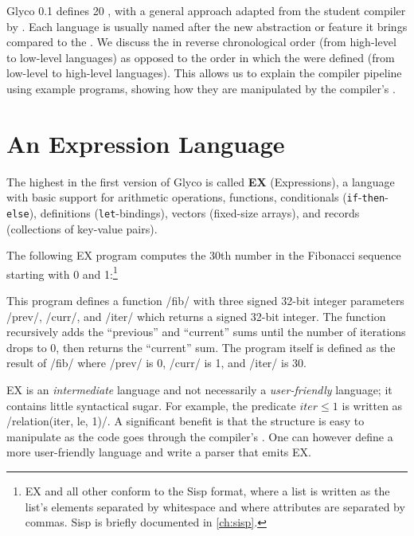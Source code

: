 \documentclass[main.tex]{subfiles}
\begin{document}
Glyco 0.1 defines 20 , with a general approach adapted from the student compiler by \citet{compcourse}. Each language is usually named after the new abstraction or feature it brings compared to the . We discuss the  in reverse chronological order (from high-level to low-level languages) as opposed to the order in which the  were defined (from low-level to high-level languages). This allows us to explain the compiler pipeline using example programs, showing how they are manipulated by the compiler's .

\section{An Expression Language} \label{sct:ex}
The highest  in the first version of Glyco is called \textbf{EX} (Expressions), a language with basic support for arithmetic operations, functions, conditionals (\texttt{if}-\texttt{then}-\texttt{else}), definitions (\texttt{let}-bindings), vectors (fixed-size arrays), and records (collections of key-value pairs).

The following EX program computes the 30th number in the Fibonacci sequence starting with 0 and 1:\footnote{EX and all other  conform to the Sisp format, where a list is written as the list's elements separated by whitespace and where attributes are separated by commas. Sisp is briefly documented in \cref{ch:sisp}.}

This program defines a function \iil/fib/ with three signed 32-bit integer parameters \iil/prev/, \iil/curr/, and \iil/iter/ which returns a signed 32-bit integer. The function recursively adds the \enquote{previous} and \enquote{current} sums until the number of iterations drops to 0, then returns the \enquote{current} sum. The program itself is defined as the result of \iil/fib/ where \iil/prev/ is 0, \iil/curr/ is 1, and \iil/iter/ is 30.

EX is an \emph{intermediate} language and not necessarily a \emph{user-friendly} language; it contains little syntactical sugar. For example, the predicate $ \textit{iter} \le 1 $ is written as \iil/relation(iter, le, 1)/. A significant benefit is that the structure is easy to manipulate as the code goes through the compiler's . One can however define a more user-friendly language and write a parser that emits EX.
\end{document}
